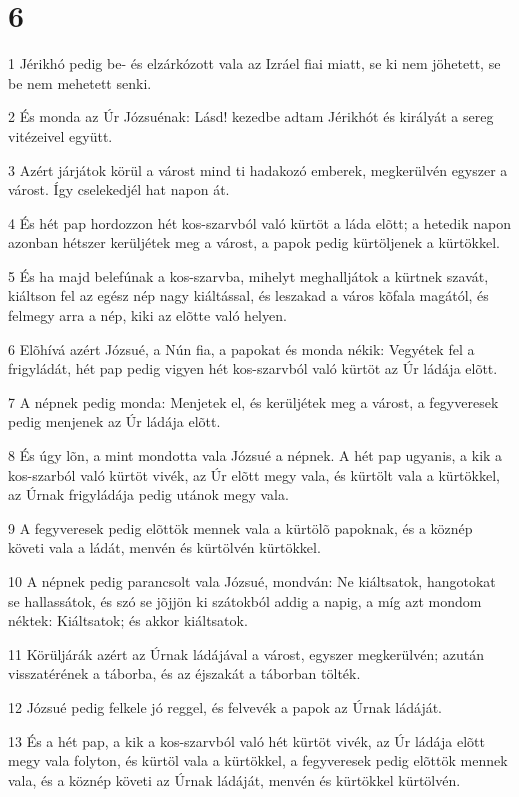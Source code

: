 \chapter{6}

\par 1 Jérikhó pedig be- és elzárkózott vala az Izráel fiai miatt, se ki nem jöhetett, se be nem mehetett senki.
\par 2 És monda az Úr Józsuénak: Lásd! kezedbe adtam Jérikhót és királyát a sereg vitézeivel együtt.
\par 3 Azért járjátok körül a várost mind ti hadakozó emberek, megkerülvén egyszer a várost. Így cselekedjél hat napon át.
\par 4 És hét pap hordozzon hét kos-szarvból való kürtöt a láda elõtt; a hetedik napon azonban hétszer kerüljétek meg a várost, a papok pedig kürtöljenek a kürtökkel.
\par 5 És ha majd belefúnak a kos-szarvba, mihelyt meghalljátok a kürtnek szavát, kiáltson fel az egész nép nagy kiáltással, és leszakad a város kõfala magától, és felmegy arra a nép, kiki az elõtte való helyen.
\par 6 Elõhívá azért Józsué, a Nún fia, a papokat és monda nékik: Vegyétek fel a frigyládát, hét pap pedig vigyen hét kos-szarvból való kürtöt az Úr ládája elõtt.
\par 7 A népnek pedig monda: Menjetek el, és kerüljétek meg a várost, a fegyveresek pedig menjenek az Úr ládája elõtt.
\par 8 És úgy lõn, a mint mondotta vala Józsué a népnek. A hét pap ugyanis, a kik a kos-szarból való kürtöt vivék, az Úr elõtt megy vala, és kürtölt vala a kürtökkel, az Úrnak frigyládája pedig utánok megy vala.
\par 9 A fegyveresek pedig elõttök mennek vala a kürtölõ papoknak, és a köznép követi vala a ládát, menvén és kürtölvén kürtökkel.
\par 10 A népnek pedig parancsolt vala Józsué, mondván: Ne kiáltsatok, hangotokat se hallassátok, és szó se jõjjön ki szátokból addig a napig, a míg azt mondom néktek: Kiáltsatok; és akkor kiáltsatok.
\par 11 Körüljárák azért az Úrnak ládájával a várost, egyszer megkerülvén; azután visszatérének a táborba, és az éjszakát a táborban tölték.
\par 12 Józsué pedig felkele jó reggel, és felvevék a papok az Úrnak ládáját.
\par 13 És a hét pap, a kik a kos-szarvból való hét kürtöt vivék, az Úr ládája elõtt megy vala folyton, és kürtöl vala a kürtökkel, a fegyveresek pedig elõttök mennek vala, és a köznép követi az Úrnak ládáját, menvén és kürtökkel kürtölvén.
